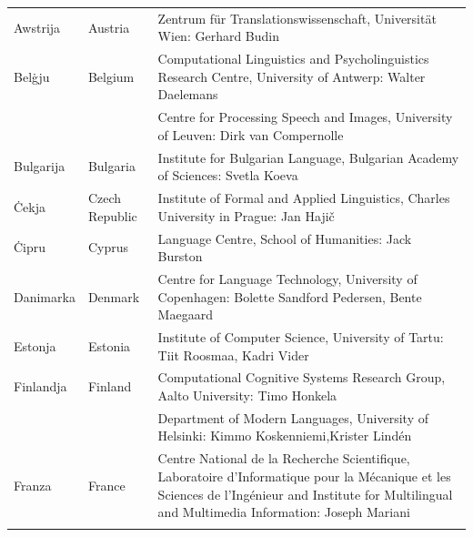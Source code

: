 \documentclass[]{../../metanetpaper}
\begin{document}
\cleardoublepage

\appendix
{}



  
\cleardoublepage

\label{metanetmembers}

\small

\begin{longtable}{@{}llp{113mm}@{}}
  Awstrija & \textcolor{grey1}{Austria} & Zentrum für Translationswissenschaft, Universität Wien: Gerhard Budin\\ \addlinespace 
  Belġju & \textcolor{grey1}{Belgium} & Computational Linguistics and Psycholinguistics Research Centre, University of Antwerp: Walter Daelemans\\ \addlinespace
  & & Centre for Processing Speech and Images, University of Leuven: Dirk van Compernolle \\ \addlinespace
  Bulgarija & \textcolor{grey1}{Bulgaria} & Institute for Bulgarian Language, Bulgarian Academy of Sciences: Svetla Koeva\\ \addlinespace
  Ċekja & \textcolor{grey1}{Czech Republic} & Institute of Formal and Applied Linguistics, Charles University in Prague: Jan Hajič\\ \addlinespace
  Ċipru & \textcolor{grey1}{Cyprus} & Language Centre, School of Humanities: Jack Burston\\ \addlinespace
  Danimarka &  \textcolor{grey1}{Denmark} & Centre for Language Technology, University of Copenhagen: \newline Bolette Sandford Pedersen, Bente Maegaard\\ \addlinespace
  Estonja & \textcolor{grey1}{Estonia} & Institute of Computer Science, University of Tartu: Tiit Roosmaa, Kadri Vider\\ \addlinespace
  Finlandja & \textcolor{grey1}{Finland} & Computational Cognitive Systems Research Group, Aalto University: Timo Honkela\\ \addlinespace
  & & Department of Modern Languages, University of Helsinki: Kimmo Koskenniemi,\newline Krister Lindén \\ \addlinespace
  Franza & \textcolor{grey1}{France} & Centre National de la Recherche Scientifique, Laboratoire d'Informatique pour la Mécanique et les Sciences de l'Ingénieur and Institute for Multilingual and Multimedia Information: Joseph Mariani \\ \addlinespace

\end{longtable}
\end{document}
